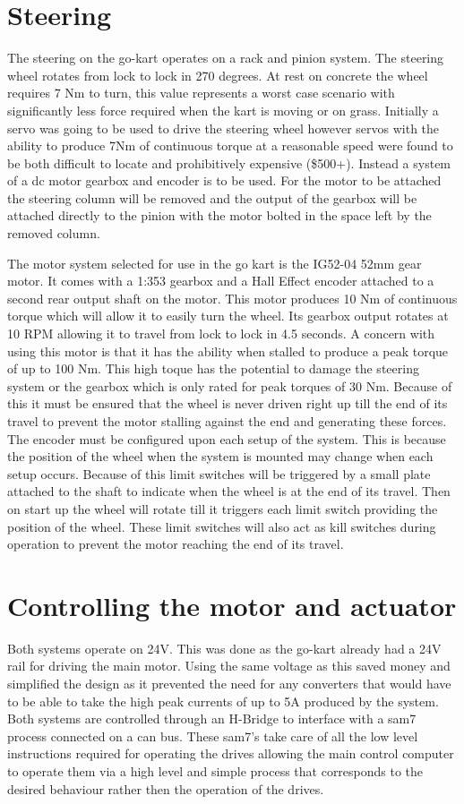 \section*{Steering}
The steering on the go-kart operates on a rack and pinion system. The steering wheel rotates from lock to lock in 270 degrees. At rest on concrete the wheel requires 7 Nm to turn, this value represents a worst case scenario with significantly less force required when the kart is moving or on grass. Initially a servo was going to be used to drive the steering wheel however servos with the ability to produce 7Nm of continuous torque at a reasonable speed were found to be both difficult to locate and prohibitively expensive (\$500+). Instead a system of a dc motor gearbox and encoder is to be used. For the motor to be attached the steering column will be removed and the output of the gearbox will be attached directly to the pinion with the motor bolted in the space left by the removed column.

The motor system selected for use in the go kart is the IG52-04 52mm gear motor. It comes with a 1:353 gearbox and a Hall Effect encoder attached to a second rear output shaft on the motor. This motor produces 10 Nm of continuous torque which will allow it to easily turn the wheel. Its gearbox output rotates at 10 RPM allowing it to travel from lock to lock in 4.5 seconds. A concern with using this motor is that it has the ability when stalled to produce a peak torque of up to 100 Nm. This high toque has the potential to damage the steering system or the gearbox which is only rated for peak torques of 30 Nm. Because of this it must be ensured that the wheel is never driven right up till the end of its travel to prevent the motor stalling against the end and generating these forces. The encoder must be configured upon each setup of the system. This is because the position of the wheel when the system is mounted may change when each setup occurs. Because of this limit switches will be triggered by a small plate attached to the shaft to indicate when the wheel is at the end of its travel. Then on start up the wheel will rotate till it triggers each limit switch providing the position of the wheel. These limit switches will also act as kill switches during operation to prevent the motor reaching the end of its travel.

\section*{Controlling the motor and actuator}
Both systems operate on 24V. This was done as the go-kart already had a 24V rail for driving the main motor. Using the same voltage as this saved money and simplified the design as it prevented the need for any converters that would have to be able to take the high peak currents of up to 5A produced by the system. Both systems are controlled through an H-Bridge to interface with a sam7 process connected on a can bus. These sam7’s take care of all the low level instructions required for operating the drives allowing the main control computer to operate them via a high level and simple process that corresponds to the desired behaviour rather then the operation of the drives.

